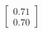 \documentclass[preview]{standalone}
\begin{document}
\begin{align*}
\begin{bmatrix} 0.71 \\ 0.70 \end{bmatrix}
\end{align*}
\end{document}
